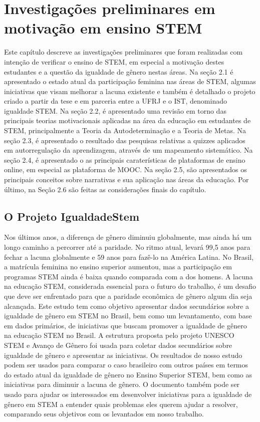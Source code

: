 \chapter{Investigações preliminares em motivação em ensino STEM}

Este capítulo descreve as investigações preliminares que foram realizadas com intenção de verificar o ensino de STEM, em especial a motivação destes estudantes e a questão da igualdade de gênero nestas áreas. Na seção 2.1 é apresentado o estado atual da participação feminina nas áreas de STEM, algumas iniciativas que visam melhorar a lacuna existente e também é detalhado o projeto criado a partir da tese e em parceria entre a UFRJ e o IST, denominado igualdade STEM. Na seção 2.2, é apresentado uma revisão em torno das principais teorias motivacionais aplicadas na área da educação em estudantes de STEM, principalmente a Teoria da Autodeterminação e a Teoria de Metas. Na seção 2.3, é apresentado o resultado das pesquisas relativas a quizzes aplicados em autorregulação da aprendizagem, através de um mapeamento sistemático. Na seção 2.4, é apresentado o as principais caraterísticas de plataformas de ensino online, em especial as plataforma de MOOC. Na seção 2.5, são apresentados os principais conceitos sobre narrativas e sua aplicação nas áreas da educação. Por último, na Seção 2.6 são feitas as considerações finais do capítulo.


\section{O Projeto IgualdadeStem}

Nos últimos anos, a diferença de gênero diminuiu globalmente, mas ainda há um longo caminho a percorrer até a paridade. No ritmo atual, levará 99,5 anos para fechar a lacuna globalmente e 59 anos para fazê-lo na América Latina. No Brasil, a matrícula feminina no ensino superior aumentou, mas a participação em programas STEM ainda é baixa quando comparada com a dos homens. A lacuna na educação STEM, considerada essencial para o futuro do trabalho, é um desafio que deve ser enfrentado para que a paridade econômica de gênero algum dia seja alcançada. Este estudo tem como objetivo apresentar dados secundários sobre a igualdade de gênero em STEM no Brasil, bem como um levantamento, com base em dados primários, de iniciativas que buscam promover a igualdade de gênero na educação STEM no Brasil. A estrutura proposta pelo projeto UNESCO STEM e Avanço de Gênero foi usada para coletar dados secundários sobre igualdade de gênero e apresentar as iniciativas. Os resultados de nosso estudo podem ser usados para comparar o caso brasileiro com outros países em termos do estado atual da igualdade de gênero no Ensino Superior STEM, bem como as iniciativas para diminuir a lacuna de gênero. O documento também pode ser usado para ajudar os interessados em desenvolver iniciativas para a igualdade de gênero em STEM a entender quais problemas eles querem ajudar a resolver, comparando seus objetivos com os levantados em nosso trabalho.

